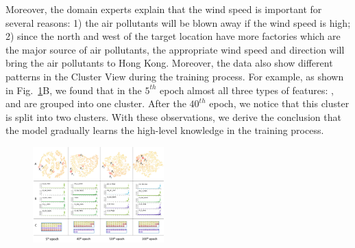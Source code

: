 Moreover, the domain experts explain that the wind speed is important for several reasons: 1) the air pollutants will  be blown away if the wind speed is high; 2) since the north and west of the target location have more factories which are the major source of air pollutants, the appropriate wind speed and direction will bring the air pollutants to Hong Kong.
Moreover, the data also show different patterns in the Cluster View during the training process. 
For example, as shown in Fig.~\ref{fig:evolution_epochs}B, we found that in the $5^{th}$ epoch almost all three types of features: \textit{\color{SLPColor}{Sealevel Pressure}}, \textit{\color{DPColor}{Dew-point}} and  \textit{\color{SPColor}{Station Pressure}} are grouped into one cluster. 
After the $40^{th}$ epoch, we notice that this cluster is split into two clusters.
With these observations, we derive the conclusion that the model gradually learns the high-level knowledge in the training process.

\begin{figure}[t]
	\centering
	\includegraphics[width=0.45\textwidth]{figure/MultiRNNExplorer/Evaluation/evolution_epochs.pdf}
	\vspace{-3mm}
	\caption{
	}
	\label{fig:evolution_epochs}
	\vspace{-4mm}
\end{figure}

